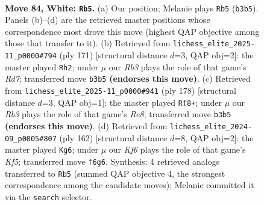 \documentclass[11pt]{article}
\begin{document}
\clearpage

\begin{figure}[p]\centering
\begin{subfigure}{0.46\textwidth}\centering
\resizebox{\linewidth}{!}{%
\newchessgame
\chessboard[
  setfen={8/k7/5K2/8/3r4/1R6/1N4P1/8 w - - 32 84},
  showmover=false,
  pgfstyle=straightmove, color=movearrow, markmove={b3-b5}
]}
\caption{}
\end{subfigure}\hfill
\begin{subfigure}{0.46\textwidth}\centering
\resizebox{\linewidth}{!}{%
\newchessgame
\chessboard[
  setfen={8/4R3/8/8/8/3n1k2/3r4/K7 b - - 3 86},
  showmover=false,
  pgfstyle=straightmove, color=movearrow, markmove={d2-h2}
]}
\caption{}
\end{subfigure}
\\[4pt]
\begin{subfigure}{0.46\textwidth}\centering
\resizebox{\linewidth}{!}{%
\newchessgame
\chessboard[
  setfen={N3R3/8/3K4/5k2/8/8/8/1r6 w - - 21 90},
  showmover=false,
  pgfstyle=straightmove, color=movearrow, markmove={e8-f8}
]}
\caption{}
\end{subfigure}\hfill
\begin{subfigure}{0.46\textwidth}\centering
\resizebox{\linewidth}{!}{%
\newchessgame
\chessboard[
  setfen={6k1/4R3/4N3/5K2/8/8/8/7r w - - 67 82},
  showmover=false,
  pgfstyle=straightmove, color=movearrow, markmove={f5-g6}
]}
\caption{}
\end{subfigure}
\caption{\textbf{Move 84, White: \texttt{Rb5}.} (a) Our position; Melanie plays \texttt{Rb5} (\texttt{b3b5}). Panels (b)--(d) are the retrieved master positions whose correspondence most drove this move (highest QAP objective among those that transfer to it). (b) Retrieved from \texttt{lichess\_elite\_2025-11\_p0000\#794} (ply 171) [structural distance $d$=3, QAP obj=2]: the master played \texttt{Rh2}; under $\mu$ our \emph{Rb3} plays the role of that game's \emph{Rd7}; transferred move \texttt{b3b5} \textbf{(endorses this move)}. (c) Retrieved from \texttt{lichess\_elite\_2025-11\_p0000\#941} (ply 178) [structural distance $d$=3, QAP obj=1]: the master played \texttt{Rf8+}; under $\mu$ our \emph{Rb3} plays the role of that game's \emph{Re8}; transferred move \texttt{b3b5} \textbf{(endorses this move)}. (d) Retrieved from \texttt{lichess\_elite\_2024-09\_p0005\#807} (ply 162) [structural distance $d$=8, QAP obj=2]: the master played \texttt{Kg6}; under $\mu$ our \emph{Kf6} plays the role of that game's \emph{Kf5}; transferred move \texttt{f6g6}. Synthesis: 4 retrieved analogs transferred to \texttt{Rb5} (summed QAP objective 4, the strongest correspondence among the candidate moves); Melanie committed it via the \texttt{search} selector.}
\label{fig:thought-m166}
\end{figure}
\end{document}
